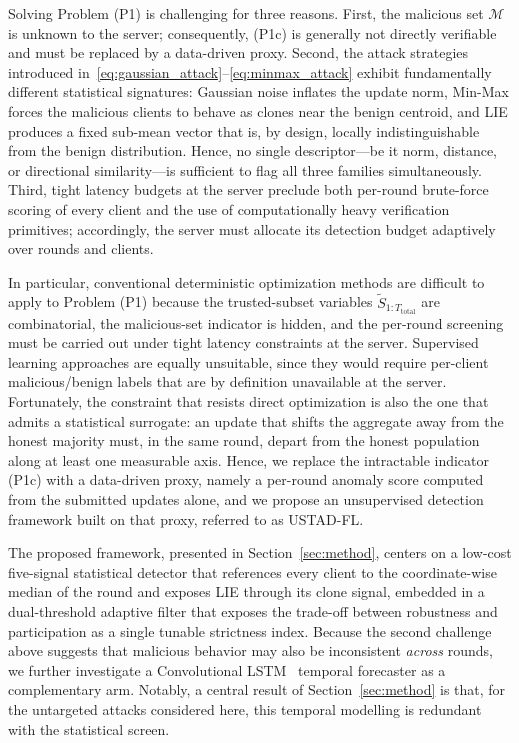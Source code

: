 \documentclass[journal]{IEEEtran}
\begin{document}
Solving Problem (P1) is challenging for three reasons. First, the malicious set $\mathcal{M}$ is unknown to the server; consequently, (P1c) is generally not directly verifiable and must be replaced by a data-driven proxy. Second, the attack strategies introduced in~\eqref{eq:gaussian_attack}--\eqref{eq:minmax_attack} exhibit fundamentally different statistical signatures: Gaussian noise inflates the update norm, Min-Max forces the malicious clients to behave as clones near the benign centroid, and LIE produces a fixed sub-mean vector that is, by design, locally indistinguishable from the benign distribution. Hence, no single descriptor—be it norm, distance, or directional similarity—is sufficient to flag all three families simultaneously. Third, tight latency budgets at the server preclude both per-round brute-force scoring of every client and the use of computationally heavy verification primitives; accordingly, the server must allocate its detection budget adaptively over rounds and clients.

In particular, conventional deterministic optimization methods are difficult to apply to Problem (P1) because the trusted-subset variables $\widetilde{S}_{1:T_{\text{total}}}$ are combinatorial, the malicious-set indicator is hidden, and the per-round screening must be carried out under tight latency constraints at the server. Supervised learning approaches are equally unsuitable, since they would require per-client malicious/benign labels that are by definition unavailable at the server. Fortunately, the constraint that resists direct optimization is also the one that admits a statistical surrogate: an update that shifts the aggregate away from the honest majority must, in the same round, depart from the honest population along at least one measurable axis. Hence, we replace the intractable indicator (P1c) with a data-driven proxy, namely a per-round anomaly score computed from the submitted updates alone, and we propose an unsupervised detection framework built on that proxy, referred to as USTAD-FL.

The proposed framework, presented in Section~\ref{sec:method}, centers on a low-cost five-signal statistical detector that references every client to the coordinate-wise median of the round and exposes LIE through its clone signal, embedded in a dual-threshold adaptive filter that exposes the trade-off between robustness and participation as a single tunable strictness index. Because the second challenge above suggests that malicious behavior may also be inconsistent \emph{across} rounds, we further investigate a Convolutional LSTM~\cite{shi2015convolutional} temporal forecaster as a complementary arm. Notably, a central result of Section~\ref{sec:method} is that, for the untargeted attacks considered here, this temporal modelling is redundant with the statistical screen.
\end{document}
